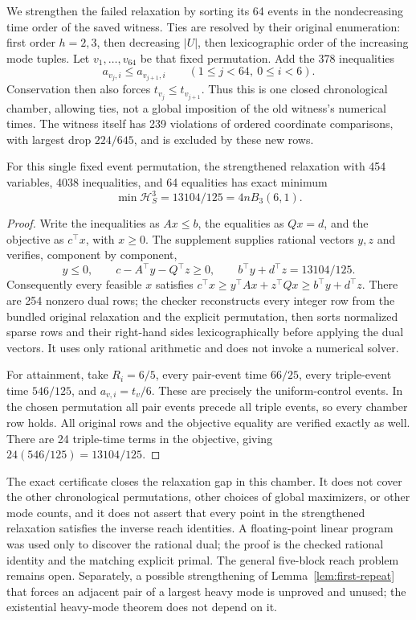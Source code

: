We strengthen the failed relaxation by sorting its 64 events in the
nondecreasing time order of the saved witness. Ties are resolved by their
original enumeration: first order $h=2,3$, then decreasing $|U|$, then
lexicographic order of the increasing mode tuples. Let $v_1,\ldots,v_{64}$
be that fixed permutation. Add the 378 inequalities
\begin{equation}\label{eq:chamber-cuts}
 a_{v_j,i}\le a_{v_{j+1},i}\qquad(1\le j<64,\ 0\le i<6).
\end{equation}
Conservation then also forces $t_{v_j}\le t_{v_{j+1}}$.
Thus this is one closed chronological chamber, allowing ties, not a
global imposition of the old witness's numerical times. The witness itself
has 239 violations of ordered coordinate comparisons, with largest drop
$224/645$, and is excluded by these new rows.

\begin{proposition}
\label{prop:chronological-chamber}
For this single fixed event permutation, the strengthened relaxation with
454 variables, 4038 inequalities, and 64 equalities has exact minimum
\[
 \min\mathcal H_S^3=13104/125=4nB_3(6,1).
\]
\end{proposition}
\begin{proof}
Write the inequalities as $Ax\le b$, the equalities as $Qx=d$, and
the objective as $c^\top x$, with $x\ge0$. The supplement supplies
rational vectors $y,z$ and verifies, component by component,
\[
 y\le0,\qquad c-A^\top y-Q^\top z\ge0,\qquad
 b^\top y+d^\top z=13104/125.
\]
Consequently every feasible $x$ satisfies
$c^\top x\ge y^\top Ax+z^\top Qx\ge b^\top y+d^\top z$.
There are 254 nonzero dual rows; the checker reconstructs every integer
row from the bundled original relaxation and the explicit permutation,
then sorts normalized sparse rows and their right-hand sides
lexicographically before applying the dual vectors.
It uses only rational arithmetic and does not invoke a numerical solver.

For attainment, take $R_i=6/5$, every pair-event time $66/25$, every
triple-event time $546/125$, and $a_{v,i}=t_v/6$. These are precisely the
uniform-control events. In the chosen permutation all pair events precede
all triple events, so every chamber row holds. All original rows and the
objective equality are verified exactly as well. There are 24 triple-time
terms in the objective, giving $24(546/125)=13104/125$.
\end{proof}

The exact certificate closes the relaxation gap in this chamber. It does
not cover the other chronological permutations, other choices of global
maximizers, or other mode counts, and it does not assert that every point
in the strengthened relaxation satisfies the inverse reach identities.
A floating-point linear program was used only to discover the rational
dual; the proof is the checked rational identity and the matching explicit
primal. The general five-block reach problem remains open. Separately, a
possible strengthening of Lemma~\ref{lem:first-repeat} that forces an
adjacent pair of a largest heavy mode is unproved and unused; the
existential heavy-mode theorem does not depend on it.

